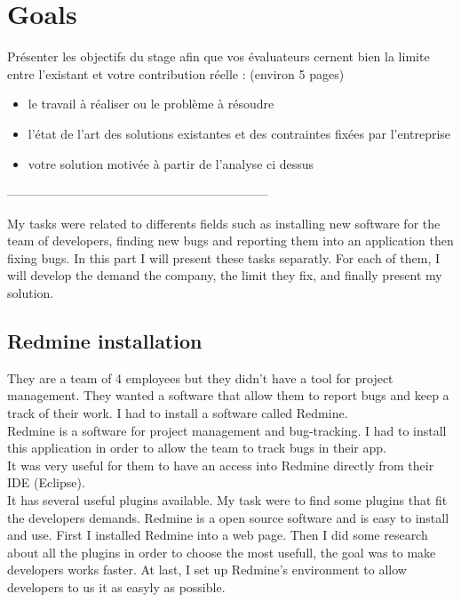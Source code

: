
\section{Goals}


Présenter les objectifs du stage afin que vos évaluateurs cernent bien la limite entre l’existant et votre contribution réelle : (environ 5 pages)
\begin{itemize}
	\item le travail à réaliser ou le problème à résoudre
	\item l’état de l’art des solutions existantes et des contraintes fixées par l’entreprise
	\item votre solution motivée à partir de l’analyse ci dessus
\end{itemize}


---------------------------------------------------------------

My tasks were related to differents fields such as installing new software for the team of developers, finding new bugs and reporting them into an application then fixing bugs. 
In this part I will present these tasks separatly. For each of them, I will develop the demand the company, the limit they fix, and finally present my solution. 

\subsection{Redmine installation}
They are a team of 4 employees but they didn't have a tool for project management. 
They wanted a software that allow them to report bugs and keep a track of their work.
I had to install a software called Redmine.\\ 
Redmine is a software for project management and bug-tracking. I had to install this application in order to allow the team to track bugs in their app. \\ 
It was very useful for them to have an access into Redmine directly from their IDE (Eclipse).\\
It has several useful plugins available. My task were to find some plugins that fit the 
developers demands. 
Redmine is a open source software and is easy to install and use. 
First I installed Redmine into a web page.  
Then I did some research about all the plugins in order to choose the most usefull, the goal was to make developers works faster. 
At last, I set up Redmine's environment to allow developers to us it as easyly as possible. 





